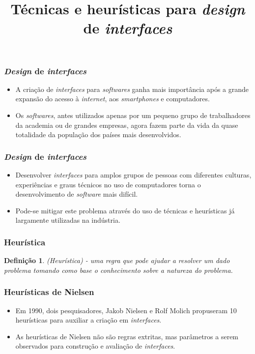 \documentclass[11pt]{beamer}
\title{Técnicas e heurísticas para \textit{design} de \textit{interfaces}}
\author{}
\date{}
\newtheorem{mydef}{Definição}
\begin{document}
    \begin{frame}[plain]
        \titlepage
    \end{frame}

    \begin{frame}
      \frametitle{\textit{Design} de \textit{interfaces}}
      \begin{itemize}
        \item A criação de \textit{interfaces} para \textit{softwares} ganha mais importância após a grande expansão do acesso à \textit{internet}, aos \textit{smartphones} e computadores.
        \item Os \textit{softwares}, antes utilizados apenas por um pequeno grupo de trabalhadores da academia ou de grandes empresas, agora fazem parte da vida da quase totalidade da população dos países mais desenvolvidos.
      \end{itemize}
    \end{frame}

    \begin{frame}
      \frametitle{\textit{Design} de \textit{interfaces}}
      \begin{itemize}
        \item Desenvolver \textit{interfaces} para amplos grupos de pessoas com diferentes culturas, experiências e graus técnicos no uso de computadores torna o desenvolvimento de \textit{software} mais difícil.
        \item Pode-se mitigar este problema através do uso de técnicas e heurísticas já largamente utilizadas na indústria.
      \end{itemize}
    \end{frame}

    \begin{frame}
      \frametitle{Heurística}
      \begin{mydef}
        (Heurística) - uma regra que pode ajudar a resolver um dado problema tomando como base o conhecimento sobre a natureza do problema.
      \end{mydef}
    \end{frame}
    
    \begin{frame}
      \frametitle{Heurísticas de Nielsen}
      \begin{itemize}
        \item Em 1990, dois pesquisadores, Jakob Nielsen e Rolf Molich propuseram 10 heurísticas para auxiliar a criação em \textit{interfaces}.
        \item As heurísticas de Nielsen não são regras extritas, mas parâmetros a serem observados para construção e avaliação de \textit{interfaces}.
      \end{itemize}
    \end{frame}
\end{document}
